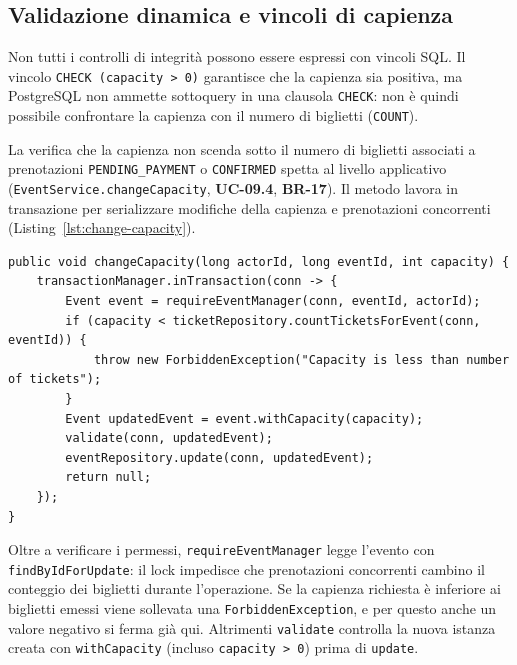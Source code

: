 \subsection{Validazione dinamica e vincoli di capienza}
\label{sec:modifica-capienza}

Non tutti i controlli di integrità possono essere espressi con vincoli SQL. Il vincolo \texttt{CHECK (capacity > 0)} garantisce che la capienza sia positiva, ma PostgreSQL non ammette sottoquery in una clausola \texttt{CHECK}: non è quindi possibile confrontare la capienza con il numero di biglietti (\texttt{COUNT}).

La verifica che la capienza non scenda sotto il numero di biglietti associati a prenotazioni \texttt{PENDING\_PAYMENT} o \texttt{CONFIRMED} spetta al livello applicativo (\texttt{EventService.changeCapacity}, \textbf{UC-09.4}, \textbf{BR-17}). Il metodo lavora in transazione per serializzare modifiche della capienza e prenotazioni concorrenti (Listing~\ref{lst:change-capacity}).

\begin{lstlisting}[caption={Verifica della soglia minima di capienza durante l'aggiornamento dell'evento.}, label={lst:change-capacity}]
public void changeCapacity(long actorId, long eventId, int capacity) {
    transactionManager.inTransaction(conn -> {
        Event event = requireEventManager(conn, eventId, actorId);
        if (capacity < ticketRepository.countTicketsForEvent(conn, eventId)) {
            throw new ForbiddenException("Capacity is less than number of tickets");
        }
        Event updatedEvent = event.withCapacity(capacity);
        validate(conn, updatedEvent);
        eventRepository.update(conn, updatedEvent);
        return null;
    });
}
\end{lstlisting}

Oltre a verificare i permessi, \texttt{requireEventManager} legge l'evento con \texttt{findByIdForUpdate}: il lock impedisce che prenotazioni concorrenti cambino il conteggio dei biglietti durante l'operazione. Se la capienza richiesta è inferiore ai biglietti emessi viene sollevata una \texttt{ForbiddenException}, e per questo anche un valore negativo si ferma già qui. Altrimenti \texttt{validate} controlla la nuova istanza creata con \texttt{withCapacity} (incluso \texttt{capacity > 0}) prima di \texttt{update}.
